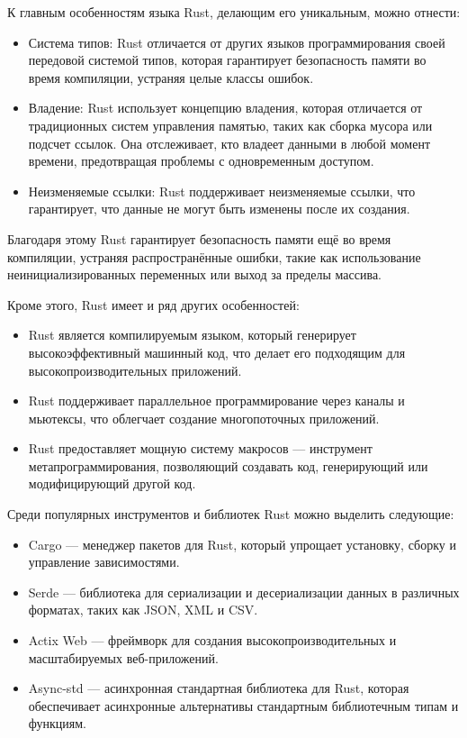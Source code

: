 К главным особенностям языка Rust, делающим его уникальным, можно отнести:
\begin{itemize}
    \item Система типов: Rust отличается от других языков программирования своей передовой системой типов, которая гарантирует безопасность памяти во время компиляции, устраняя целые классы ошибок.
    \item Владение: Rust использует концепцию владения, которая отличается от традиционных систем управления памятью, таких как сборка мусора или подсчет ссылок. Она отслеживает, кто владеет данными в любой момент времени, предотвращая проблемы с одновременным доступом.
    \item Неизменяемые ссылки: Rust поддерживает неизменяемые ссылки, что гарантирует, что данные не могут быть изменены после их создания.
\end{itemize}

Благодаря этому Rust гарантирует безопасность памяти ещё во время компиляции, устраняя распространённые ошибки, такие как использование неинициализированных переменных или выход за пределы массива.

Кроме этого, Rust имеет и ряд других особенностей:
\begin{itemize}
    \item Rust является компилируемым языком, который генерирует высокоэффективный машинный код, что делает его подходящим для высокопроизводительных приложений.
    \item Rust поддерживает параллельное программирование через каналы и мьютексы, что облегчает создание многопоточных приложений.
    \item Rust предоставляет мощную систему макросов --- инструмент метапрограммирования, позволяющий создавать код, генерирующий или модифицирующий другой код.
\end{itemize}

Среди популярных инструментов и библиотек Rust можно выделить следующие:
\begin{itemize}
    \item Cargo --- менеджер пакетов для Rust, который упрощает установку, сборку и управление зависимостями.
    \item Serde --- библиотека для сериализации и десериализации данных в различных форматах, таких как JSON, XML и CSV.
    \item Actix Web --- фреймворк для создания высокопроизводительных и масштабируемых веб-приложений.
    \item Async-std --- асинхронная стандартная библиотека для Rust, которая обеспечивает асинхронные альтернативы стандартным библиотечным типам и функциям.
\end{itemize}

